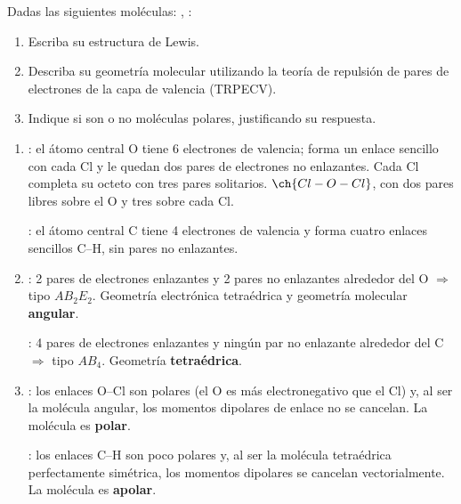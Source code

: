 \begin{exerciseEVAU}
    Dadas las siguientes moléculas: , :
    \begin{enumerate}[label=\letraminuscula]
    \item Escriba su estructura de Lewis.
    \item Describa su geometría molecular utilizando la teoría de repulsión de pares de electrones de
    la capa de valencia (TRPECV).
    \item Indique si son o no moléculas polares, justificando su respuesta.
    \end{enumerate}
    \begin{solu}
        \begin{enumerate}[label=\letraminuscula]
            \item \textbf{}: el átomo central O tiene 6 electrones de valencia; forma un enlace sencillo con cada Cl y le quedan dos pares de electrones no enlazantes. Cada Cl completa su octeto con tres pares solitarios.
            \(\ch{Cl-O-Cl}\), con dos pares libres sobre el O y tres sobre cada Cl.

            \textbf{}: el átomo central C tiene 4 electrones de valencia y forma cuatro enlaces sencillos C--H, sin pares no enlazantes.

            \item \textbf{}: 2 pares de electrones enlazantes y 2 pares no enlazantes alrededor del O $\Rightarrow$ tipo \(AB_2E_2\). Geometría electrónica tetraédrica y geometría molecular \textbf{angular}.

            \textbf{}: 4 pares de electrones enlazantes y ningún par no enlazante alrededor del C $\Rightarrow$ tipo \(AB_4\). Geometría \textbf{tetraédrica}.

            \item \textbf{}: los enlaces O--Cl son polares (el O es más electronegativo que el Cl) y, al ser la molécula angular, los momentos dipolares de enlace no se cancelan. La molécula es \textbf{polar}.

            \textbf{}: los enlaces C--H son poco polares y, al ser la molécula tetraédrica perfectamente simétrica, los momentos dipolares se cancelan vectorialmente. La molécula es \textbf{apolar}.
        \end{enumerate}
    \end{solu}
\end{exerciseEVAU}

